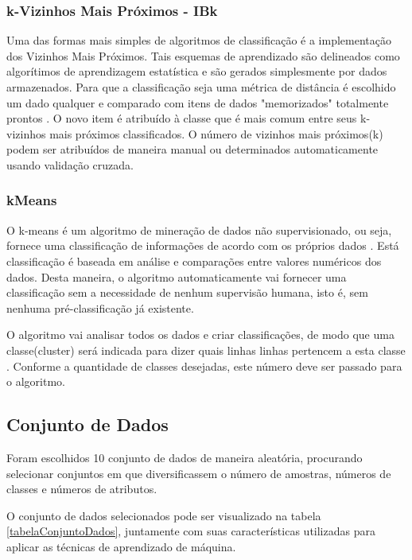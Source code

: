 \documentclass[12pt]{article}
\begin{document}
\subsubsection{k-Vizinhos Mais Próximos - IBk} \label{sec:ibk}

    Uma das formas mais simples de algoritmos de classificação é a implementação dos Vizinhos Mais Próximos. Tais esquemas de aprendizado são delineados como algorítimos de aprendizagem estatística e são gerados simplesmente por dados armazenados. Para que a classificação seja uma métrica de distância é escolhido um dado qualquer e comparado com itens de dados "memorizados" totalmente prontos \cite{rezende2003sistemas}. O novo item é atribuído à classe que é mais comum entre seus k-vizinhos mais próximos classificados. O número de vizinhos mais próximos(k) podem ser atribuídos de maneira manual ou determinados automaticamente usando validação cruzada.

\subsubsection{kMeans} \label{sec:kmean}

    O k-means é um algoritmo de mineração de dados não supervisionado, ou seja, fornece uma classificação de informações de acordo com os próprios dados \cite{database}. Está classificação é baseada em análise e comparações entre valores numéricos dos dados. Desta maneira, o algoritmo automaticamente vai fornecer uma classificação sem a necessidade de nenhum supervisão humana, isto é, sem nenhuma pré-classificação já existente.
    
    O algoritmo vai analisar todos os dados e criar classificações, de modo que uma classe(cluster) será indicada para  dizer quais linhas linhas pertencem a esta classe \cite{smoke}. Conforme a quantidade de classes desejadas, este número deve ser passado para o algoritmo.
    
\subsection{Conjunto de Dados} \label{sec:dataset}

    Foram escolhidos 10 conjunto de dados de maneira aleatória, procurando selecionar conjuntos em que diversificassem o número de amostras, números de classes e números de atributos.
    
    O conjunto de dados selecionados pode ser visualizado na tabela \ref{tabelaConjuntoDados}, juntamente com suas características utilizadas para aplicar as técnicas de aprendizado de máquina.
\end{document}
